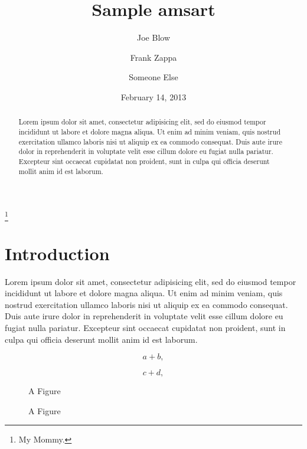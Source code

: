 \documentclass{amsart}
\theoremstyle{definition}
\theoremstyle{remark}
\numberwithin{equation}{section}
\begin{document}
\title{Sample amsart}
\author{Joe Blow}
\address{Somewhere, USA}
\thanks{My Mommy.}

\author{Frank Zappa}
\address{Baltimore}

\author{Someone Else}
\address{Somewhere Else}



\date{February 14, 2013}


\maketitle

\begin{abstract}
Lorem ipsum dolor sit amet, consectetur adipisicing elit, sed do eiusmod tempor incididunt ut labore et dolore magna aliqua. Ut enim ad minim veniam, quis nostrud exercitation ullamco laboris nisi ut aliquip ex ea commodo consequat. Duis aute irure dolor in reprehenderit in voluptate velit esse cillum dolore eu fugiat nulla pariatur. Excepteur sint occaecat cupidatat non proident, sunt in culpa qui officia deserunt mollit anim id est laborum.
\end{abstract}

\section{Introduction}
Lorem ipsum dolor sit amet, consectetur adipisicing elit, sed do eiusmod tempor incididunt ut labore et dolore magna aliqua. Ut enim ad minim veniam, quis nostrud exercitation ullamco laboris nisi ut aliquip ex ea commodo consequat. Duis aute irure dolor in reprehenderit in voluptate velit esse cillum dolore eu fugiat nulla pariatur. Excepteur sint occaecat cupidatat non proident, sunt in culpa qui officia deserunt mollit anim id est laborum.

\begin{equation}
 a + b,
\end{equation}

\begin{equation}
 c + d,
\end{equation}

\begin{figure}
\begin{centering}
A Figure\\
\end{centering}
\caption{A Figure}
\end{figure}
\end{document}
